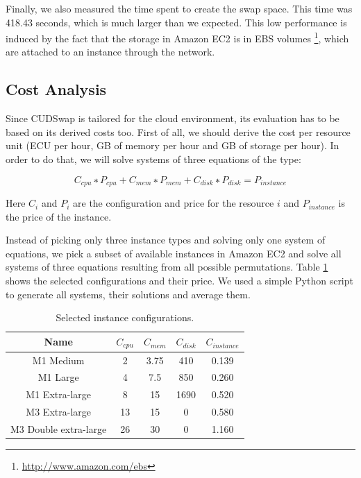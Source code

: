 Finally, we also measured the time spent to create the swap space. This time was
418.43 seconds, which is much larger than we expected. This low performance is induced
by the fact that the storage in Amazon EC2 is in EBS volumes \footnote{\url{http://www.amazon.com/ebs}}, which are attached
to an instance through the network.

\subsection{Cost Analysis}\label{subme_cost}

Since CUDSwap is tailored for the cloud environment, its evaluation has to be based
on its derived costs too. First of all, we should derive the cost per resource unit
(ECU per hour, GB of memory per hour and GB of storage per hour). In order to do that,
we will solve systems of three equations of the type:

$$
C_{cpu} ∗ P_{cpu} + C_{mem} ∗ P_{mem} + C_{disk} ∗ P_{disk} = P_{instance}
$$

Here $C_i$ and $P_i$ are the configuration and price for the resource $i$ and $P_{instance}$
is the price of the instance.

Instead of picking only three instance types and solving only one system of equations,
we pick a subset of available instances in Amazon EC2 and solve all systems of three
equations resulting from all possible permutations. Table \ref{metable1} shows the selected
configurations and their price. We used a simple Python script to generate all systems,
their solutions and average them.

\begin{table}[htbp]
\centering
\caption[Selected instance configurations]{Selected instance configurations.}\label{metable1}
\begin{tabular*}{\textwidth}{ccccc}
\toprule
Name & $C_{cpu}$ & $C_{mem}$ & $C_{disk}$ & $C_{instance}$\\
\midrule
M1 Medium & 2 & 3.75 & 410 & 0.139\\
\midrule
M1 Large & 4 & 7.5 & 850 & 0.260\\
\midrule
M1 Extra-large & 8 & 15 & 1690 & 0.520\\
\midrule
M3 Extra-large & 13 & 15 & 0 & 0.580\\
\midrule
M3 Double extra-large & 26 & 30 & 0 & 1.160\\
\bottomrule
\end{tabular*}
\end{table}

